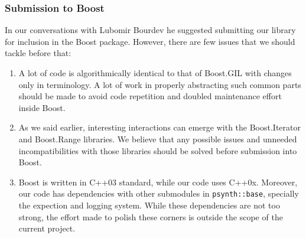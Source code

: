 \subsubsection{Submission to Boost}

In our conversations with Lubomir Bourdev he suggested submitting our
library for inclusion in the Boost package. However, there are few
issues that we should tackle before that:

\begin{enumerate}
\item A lot of code is algorithmically identical to that of Boost.GIL
  with changes only in terminology. A lot of work in properly
  abstracting such common parts should be made to avoid code
  repetition and doubled maintenance effort inside Boost.

\item As we said earlier, interesting interactions can emerge with
  the Boost.Iterator and Boost.Range libraries. We believe that any
  possible issues and unneeded incompatibilities with those libraries
  should be solved before submission into Boost.

\item Boost is written in C++03 standard, while our code uses
  C++0x. Moreover, our code has dependencies with other submodules in
  \texttt{psynth::base}, specially the expection and logging
  system. While these dependencies are not too strong, the effort made
  to polish these corners is outside the scope of the current project.
\end{enumerate}


